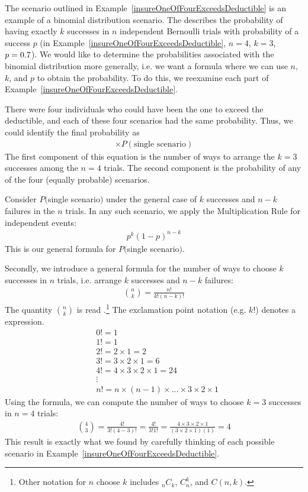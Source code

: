 The scenario outlined in Example~\ref{insureOneOfFourExceedsDeductible} is an
example of a binomial distribution scenario.
The 
describes the probability of having exactly $k$ successes
in $n$ independent Bernoulli trials with probability
of a success $p$
(in Example~\ref{insureOneOfFourExceedsDeductible},
$n=4$, $k=3$, $p=0.7{}$).
We would like to determine the probabilities associated
with the binomial distribution more generally,
i.e. we want a formula where we can use $n$, $k$, and $p$
to obtain the probability.
To do this, we reexamine each part of
Example~\ref{insureOneOfFourExceedsDeductible}.

There were four individuals who could have been the one
to exceed the deductible, and each of these four scenarios
had the same probability.
Thus, we could identify the final probability as
\begin{align*}
[\text{\# of scenarios}] \times P(\text{single scenario})
\end{align*}
The first component of this equation is the number of ways
to arrange the $k=3$ successes among the $n=4$ trials.
The second component is the probability of any of the four
(equally probable) scenarios.

\D{\newpage}

Consider $P($single scenario$)$ under the general case of
$k$ successes and $n-k$ failures in the $n$ trials.
In any such scenario, we apply the Multiplication Rule
for independent events:
\begin{align*}
p^k (1 - p)^{n - k}
\end{align*}
This is our general formula for $P($single scenario$)$.

Secondly, we introduce a general formula for the number
of ways to choose $k$ successes in $n$ trials,
i.e. arrange $k$ successes and $n - k$ failures:
\begin{align*}
{n\choose k} = \frac{n!}{k! (n - k)!}
\end{align*}
The quantity ${n\choose k}$ is read
.\footnote{Other notation for
  $n$ choose $k$ includes $_nC_k$, $C_n^k$, and $C(n,k)$.}
The exclamation point notation (e.g. $k!$) denotes
a  expression.\label{factorial_defined}
\begin{align*}
& 0! = 1 \\
& 1! = 1 \\
& 2! = 2\times1 = 2 \\
& 3! = 3\times2\times1 = 6 \\
& 4! = 4\times3\times2\times1 = 24 \\
& \vdots \\
& n! = n\times(n-1)\times...\times3\times2\times1
\end{align*}
Using the formula, we can compute the number of ways
to choose $k = 3$ successes in $n = 4$ trials:
\begin{align*}
{4 \choose 3} = \frac{4!}{3!(4-3)!}
  = \frac{4!}{3!1!} 
  = \frac{4\times3\times2\times1}{(3\times2\times1) (1)}
  = 4
\end{align*}
This result is exactly what we found by carefully thinking
of each possible scenario in
Example~\ref{insureOneOfFourExceedsDeductible}.

